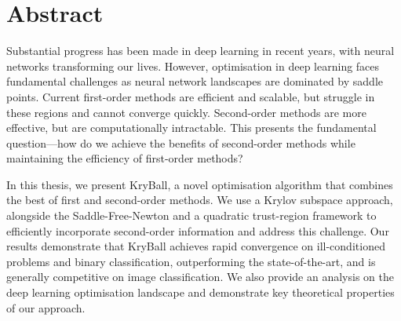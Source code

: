 \chapter*{Abstract}

Substantial progress has been made in deep learning in recent years, with neural networks transforming our lives. However, optimisation in deep learning faces fundamental challenges as neural network landscapes are dominated by saddle points. Current first-order methods are efficient and scalable, but struggle in these regions and cannot converge quickly. Second-order methods are more effective, but are computationally intractable. This presents the fundamental question---how do we achieve the benefits of second-order methods while maintaining the efficiency of first-order methods?

In this thesis, we present KryBall, a novel optimisation algorithm that combines the best of first and second-order methods. We use a Krylov subspace approach, alongside the Saddle-Free-Newton and a quadratic trust-region framework to efficiently incorporate second-order information and address this challenge. Our results demonstrate that KryBall achieves rapid convergence on ill-conditioned problems and binary classification, outperforming the state-of-the-art, and is generally competitive on image classification. We also provide an analysis on the deep learning optimisation landscape and demonstrate key theoretical properties of our approach.